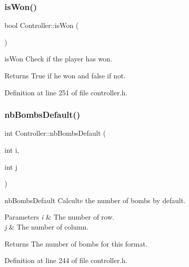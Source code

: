\subsubsection{\texorpdfstring{is\+Won()}{isWon()}}
{\footnotesize\ttfamily bool Controller\+::is\+Won (\begin{DoxyParamCaption}{ }\end{DoxyParamCaption})\hspace{0.3cm}{\ttfamily [inline]}}



is\+Won Check if the player has won. 

\begin{DoxyReturn}{Returns}
True if he won and false if not. 
\end{DoxyReturn}


Definition at line 251 of file controller.\+h.

\mbox{\label{class_controller_abaf42e3aabfc99cd4bc9c3395601e87f}} 
\subsubsection{\texorpdfstring{nb\+Bombs\+Default()}{nbBombsDefault()}}
{\footnotesize\ttfamily int Controller\+::nb\+Bombs\+Default (\begin{DoxyParamCaption}\item[{int}]{i,  }\item[{int}]{j }\end{DoxyParamCaption})\hspace{0.3cm}{\ttfamily [inline]}}



nb\+Bombs\+Default Calculte the number of bombs by default. 


\begin{DoxyParams}{Parameters}
{\em i} & The number of row. \\
\hline
{\em j} & The number of column. \\
\hline
\end{DoxyParams}
\begin{DoxyReturn}{Returns}
The number of bombs for this format. 
\end{DoxyReturn}


Definition at line 244 of file controller.\+h.

\mbox{\label{class_controller_ab237d20daccadca0d4bad9194d17c306}} 
